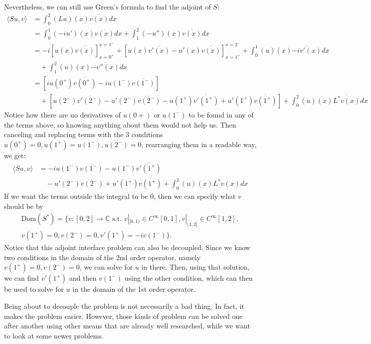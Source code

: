 \documentclass[11pt,reqno,oneside,a4paper]{article}
\begin{document}
Nevertheless, we can still use Green's formula to find the adjoint of $S$:
\begin{align*}
\langle Su,v \rangle 
&= \int_{0}^{2}(Lu)(x)\overline{v(x)}dx \\
&= \int_{0}^{1}(-iu')(x)\overline{v(x)}dx +     
   \int_{1}^{2}(-u'')(x)\overline{v(x)}dx \\
&= -i\left[u(x)\overline{v(x)}\right]_{x = 0^+}^{x=1^-} +
   \left[u(x)\overline{v'(x)} - 
   u'(x)\overline{v(x)}\right]_{x = 1^+}^{x=2^-} + \int_{0}^{1}(u)(x)\overline{-iv'(x)}dx  \\ &\quad +\int_{1}^{2}(u)(x)\overline{-v''(x)}dx\\
&= \left[iu(0^+)\overline{v(0^+)} 
   -iu(1^-)\overline{v(1^-)}\right] \\ &\quad +
   \left[u(2^-)\overline{v'(2^-)} - 
   u'(2^-)\overline{v(2^-)} -
   u(1^+)\overline{v'(1^+)} + 
   u'(1^+)\overline{v(1^+)}\right]+ 
   \int_{0}^{2}(u)(x)\overline{L^*v(x)}dx
\end{align*}
Notice how there are no derivatives of $u(0+)$ or $u(1^-)$ to be found in any of the terms above, so knowing anything about them would not help us.
Then canceling and replacing terms with the 3 conditions $u(0^+) = 0, u(1^+)=u(1^-), u(2^-)=0$, rearranging them in a readable way, we get:
\begin{align*}
\langle Su,v \rangle 
&= -iu(1^-)\overline{v(1^-)}
 - u(1^-)\overline{v'(1^+)} \\&\quad
 - u'(2^-)\overline{v(2^-)}
 + u'(1^+)\overline{v(1^+)}
 + \int_{0}^{2}(u)(x)\overline{L^*v(x)}dx
\end{align*}
If we want the terms outside the integral to be 0, then we can specify what $v$ should be by
\begin{multline*}
\text{Dom}(S^*) = \{v:[0,2] \to \mathbb{C} \text{ s.t. } v|_{[0,1)} \in C^\infty[0,1], v|_{(1,2]} \in C^\infty[1,2],\\ v(1^+) = 0, v(2^-) = 0, v'(1^+)=-iv(1^-)\}.
\end{multline*}
Notice that this adjoint interface problem can also be decoupled. Since we know two conditions in the domain of the 2nd order operator, namely $v(1^+) = 0, v(2^-) = 0$, we can solve for $u$ in there. Then, using that solution, we can find $v'(1^+)$ and then $v(1^-)$ using the other condition, which can then be used to solve for $u$ in the domain of the 1st order operator.

Being about to decouple the problem is not necessarily a bad thing. In fact, it makes the problem easier. However, those kinds of problem can be solved one after another using other means that are already well researched, while we want to look at some newer problems. 
\end{document}
